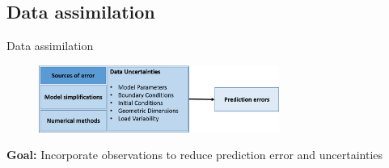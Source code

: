 \documentclass[aspectratio=169]{beamer} %
\begin{document}
\subsection{Data assimilation}
\begin{frame}{Data assimilation}
    \begin{figure}
        \centering
        \includegraphics[width=0.7\textwidth]{images/source_of_uncertainties.png}
    \end{figure}

    \textbf{Goal:} Incorporate observations to reduce prediction error and uncertainties
    \begin{figure}
        \centering
    \end{figure}
    \vfill
\end{frame}
\end{document}
